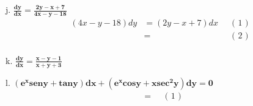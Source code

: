 \documentclass{article}
\newcommand{\newLine}[3]{ #1 & = #2 && \text{(#3)}\\ }
\newcommand{\newProblem}[2]{ \hspace{10mm} #1. $
\boldsymbol{ #2 }
$  \break }
\newcommand{\e}[1]{e^{#1}}
\begin{document}
\begin{flushleft}
        \newProblem{j}{ \frac{dy}{dx} = \frac{2y-x+7}{4x-y-18} }
            \begin{align*}
                \newLine{ ( 4x-y-18 )dy } { (2y-x+7)dx } { 1 }
                \newLine{  } {  } { 2 }
            \end{align*}

        \newProblem{k}{ \frac{dy}{dx} = \frac{ x-y-1 }{ x+y+3 } }

        \newProblem{l}{ ( \e{x}seny + tany )dx + ( \e{x}cosy + xsec^{2}y )dy = 0 }
         \begin{align*}
             \newLine{  } {  } { 1 }
         \end{align*}
    \end{flushleft}
\end{document}
